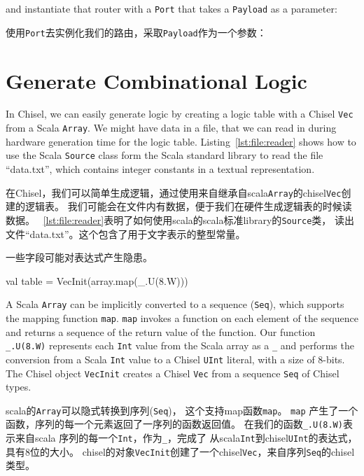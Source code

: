 \documentclass[%
    10pt,
    headinclude, footexclude,
    openright, %
    notitlepage,
    cleardoubleempty,
    headsepline,
    pointlessnumbers,
    bibtotoc, idxtotoc,
    ]{scrbook}
\newcommand{\code}[1]{{\small{\texttt{#1}}}}
\begin{document}
\noindent and instantiate that router with a \code{Port} that takes
a \code{Payload} as a parameter:

\noindent 使用\code{Port}去实例化我们的路由，采取\code{Payload}作为一个参数：



\section{Generate Combinational Logic}

In Chisel, we can easily generate logic by creating a logic table with
a Chisel \code{Vec} from a Scala \code{Array}.
We might have data in a file, that we can read in during hardware generation
time for the logic table.
Listing~\ref{lst:file:reader} shows how to use the Scala \code{Source}
class form the Scala standard library to read the file ``data.txt'', which
contains integer constants in a textual representation.

在Chisel，我们可以简单生成逻辑，通过使用来自继承自scala\code{Array}的chisel\code{Vec}创建的逻辑表。
我们可能会在文件内有数据，便于我们在硬件生成逻辑表的时候读数据。
~\ref{lst:file:reader}表明了如何使用scala的scala标准library的\code{Source}类，
读出文件``data.txt''。这个包含了用于文字表示的整型常量。

一些字段可能对表达式产生隐患。

\begin{chisel}
  val table = VecInit(array.map(_.U(8.W)))
\end{chisel}

\noindent A Scala \code{Array} can be implicitly converted to a sequence (\code{Seq}),
which supports the mapping function \code{map}.
\code{map} invokes a function on each element of the sequence and returns
a sequence of the return value of the function. Our function \code{\_.U(8.W)} represents
each \code{Int} value from the Scala array as a \code{\_} and performs the conversion
from a Scala \code{Int} value to a Chisel \code{UInt} literal, with a size of 8-bits.
The Chisel object \code{VecInit} creates a Chisel \code{Vec} from a sequence \code{Seq}
of Chisel types.

\noindent scala的\code{Array}可以隐式转换到序列(\code{Seq})，
这个支持map函数\code{map}。
\code{map} 产生了一个函数，序列的每一个元素返回了一序列的函数返回值。
在我们的函数\code{\_.U(8.W)}表示来自scala 序列的每一个\code{Int}，作为\code{\_}，完成了
从scala\code{Int}到chisel\code{UInt}的表达式，具有8位的大小。
chisel的对象\code{VecInit}创建了一个chisel\code{Vec}，来自序列\code{Seq}的chisel类型。
\end{document}
